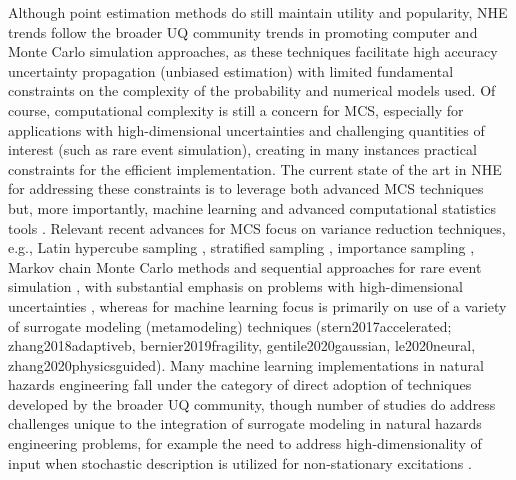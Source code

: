 Although point estimation methods do still maintain utility and popularity, NHE trends follow the broader UQ community trends in promoting computer and Monte Carlo simulation approaches, as these techniques facilitate high accuracy uncertainty propagation (unbiased estimation) with limited fundamental constraints on the complexity of the probability and numerical models used. Of course, computational complexity is still a concern for MCS, especially for applications with high-dimensional uncertainties and challenging quantities of interest (such as rare event simulation), creating in many instances practical constraints for the efficient implementation. The current state of the art in NHE for addressing these constraints is to leverage both advanced MCS techniques \citep{au2003subset,li2017system,bansal2018subset} but, more importantly, machine learning and advanced computational statistics tools \citep{echard2011akmcs, abbiati2017hierarchical, ding2018multifidelity, su2018efficient, wang2018bayesian}. Relevant recent advances for MCS focus on variance reduction techniques, e.g., Latin hypercube sampling \citep{vamvatsikos2014seismic}, stratified sampling \citep{jayaram2010efficient}, importance sampling \citep{papaioannou2018reliability}, Markov chain Monte Carlo methods \citep{au2003subset} and sequential approaches for rare event simulation \citep{jia2017new}, with substantial emphasis on problems with high-dimensional uncertainties \citep{au2003subset,wang2016crossentropybased}, whereas for machine learning focus is primarily on use of a variety of surrogate modeling (metamodeling) techniques (stern2017accelerated; zhang2018adaptiveb, bernier2019fragility, gentile2020gaussian, le2020neural, zhang2020physicsguided). Many machine learning implementations in natural hazards engineering fall under the category of direct adoption of techniques developed by the broader UQ community, though number of studies do address challenges unique to the integration of surrogate modeling in natural hazards engineering problems, for example the need to address high-dimensionality of input when stochastic description is utilized for non-stationary excitations \citep{gidaris2015kriging}.  

